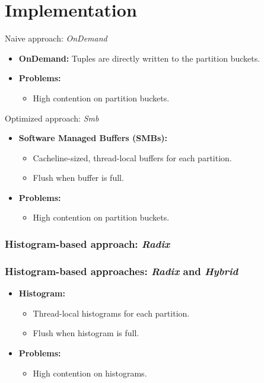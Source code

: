 \section{Implementation}
\begin{frame}{Naive approach: \emph{OnDemand}}
  \begin{itemize}
    \item \textbf{OnDemand:}
          Tuples are directly written to the partition buckets.
    \item \textbf{Problems:}
          \begin{itemize}
            \item High contention on partition buckets.
          \end{itemize}
  \end{itemize}
\end{frame}

\begin{frame}{Optimized approach: \emph{Smb}}
  \begin{itemize}
    \item \textbf{Software Managed Buffers (SMBs):}
          \begin{itemize}
            \item Cacheline-sized, thread-local buffers for each partition.
            \item Flush when buffer is full.
          \end{itemize}
    \item \textbf{Problems:}
          \begin{itemize}
            \item High contention on partition buckets.
          \end{itemize}
  \end{itemize}
\end{frame}

\begin{frame}
  \frametitle<1>{{Histogram-based approach: \emph{Radix}}}
  \frametitle<2>{{Histogram-based approaches: \emph{Radix} and \emph{Hybrid}}}
  \begin{itemize}
    \item \textbf{Histogram:}
          \begin{itemize}
            \item Thread-local histograms for each partition.
            \item Flush when histogram is full.
          \end{itemize}
    \item \textbf{Problems:}
          \begin{itemize}
            \item High contention on histograms.
          \end{itemize}
  \end{itemize}
\end{frame}

